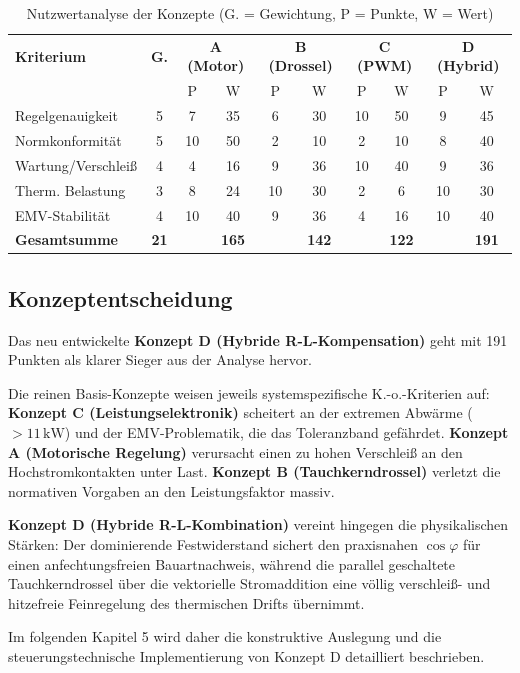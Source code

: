 \begin{table}[H]
    \centering
    \caption{Nutzwertanalyse der Konzepte (G. = Gewichtung, P = Punkte, W = Wert)}
    \label{tab:nutzwertanalyse_kompakt}
    \begin{tabular}{l|c|cc|cc|cc|cc}
        \hline
        \textbf{Kriterium} & \textbf{G.} & \multicolumn{2}{c|}{\textbf{A (Motor)}} & \multicolumn{2}{c|}{\textbf{B (Drossel)}} & \multicolumn{2}{c|}{\textbf{C (PWM)}} & \multicolumn{2}{c}{\textbf{D (Hybrid)}} \\
        & & P & W & P & W & P & W & P & W \\
        \hline
        Regelgenauigkeit   & 5 & 7  & 35 & 6  & 30 & 10 & 50 & 9  & 45 \\
        Normkonformität    & 5 & 10 & 50 & 2  & 10 & 2  & 10 & 8  & 40 \\
        Wartung/Verschleiß & 4 & 4  & 16 & 9  & 36 & 10 & 40 & 9  & 36 \\
        Therm. Belastung   & 3 & 8  & 24 & 10 & 30 & 2  & 6  & 10 & 30 \\
        EMV-Stabilität     & 4 & 10 & 40 & 9  & 36 & 4  & 16 & 10 & 40 \\
        \hline
        \textbf{Gesamtsumme}& \textbf{21}& & \textbf{165} & & \textbf{142} & & \textbf{122} & & \textbf{191} \\
        \hline
    \end{tabular}
\end{table}
\subsection{Konzeptentscheidung}
\label{sec:entscheidung}

Das neu entwickelte \textbf{Konzept D (Hybride R-L-Kompensation)} geht mit 191 Punkten als klarer Sieger aus der Analyse hervor. 

Die reinen Basis-Konzepte weisen jeweils systemspezifische K.-o.-Kriterien auf: \textbf{Konzept C (Leistungselektronik)} scheitert an der extremen Abwärme ($> 11\,\text{kW}$) und der EMV-Problematik, die das Toleranzband gefährdet. \textbf{Konzept A (Motorische Regelung)} verursacht einen zu hohen Verschleiß an den Hochstromkontakten unter Last. \textbf{Konzept B (Tauchkerndrossel)} verletzt die normativen Vorgaben an den Leistungsfaktor massiv.

\textbf{Konzept D (Hybride R-L-Kombination)} vereint hingegen die physikalischen Stärken: Der dominierende Festwiderstand sichert den praxisnahen $\cos\varphi$ für einen anfechtungsfreien Bauartnachweis, während die parallel geschaltete Tauchkerndrossel über die vektorielle Stromaddition eine völlig verschleiß- und hitzefreie Feinregelung des thermischen Drifts übernimmt. 

Im folgenden Kapitel 5 wird daher die konstruktive Auslegung und die steuerungstechnische Implementierung von Konzept D detailliert beschrieben.
